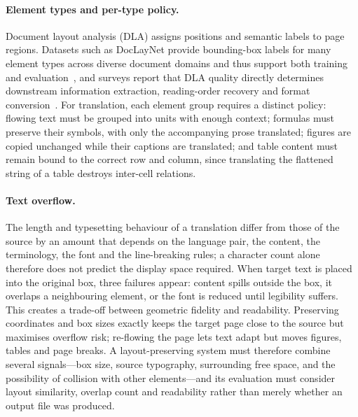 \paragraph{Element types and per-type policy.} Document layout analysis (DLA)
assigns positions and semantic labels to page regions. Datasets such as
DocLayNet provide bounding-box labels for many element types across diverse
document domains and thus support both training and
evaluation~\citep{doclaynet}, and surveys report that DLA quality directly
determines downstream information extraction, reading-order recovery and format
conversion~\citep{doclayout-survey}. For translation, each element group
requires a distinct policy: flowing text must be grouped into units with enough
context; formulas must preserve their symbols, with only the accompanying prose
translated; figures are copied unchanged while their captions are translated;
and table content must remain bound to the correct row and column, since
translating the flattened string of a table destroys inter-cell relations.

\paragraph{Text overflow.} The length and typesetting behaviour of a
translation differ from those of the source by an amount that depends on the
language pair, the content, the terminology, the font and the line-breaking
rules; a character count alone therefore does not predict the display space
required. When target text is placed into the original box, three failures
appear: content spills outside the box, it overlaps a neighbouring element, or
the font is reduced until legibility suffers. This creates a trade-off between
geometric fidelity and readability. Preserving coordinates and box sizes
exactly keeps the target page close to the source but maximises overflow risk;
re-flowing the page lets text adapt but moves figures, tables and page breaks.
A layout-preserving system must therefore combine several signals---box size,
source typography, surrounding free space, and the possibility of collision
with other elements---and its evaluation must consider layout similarity,
overlap count and readability rather than merely whether an output file was
produced.

